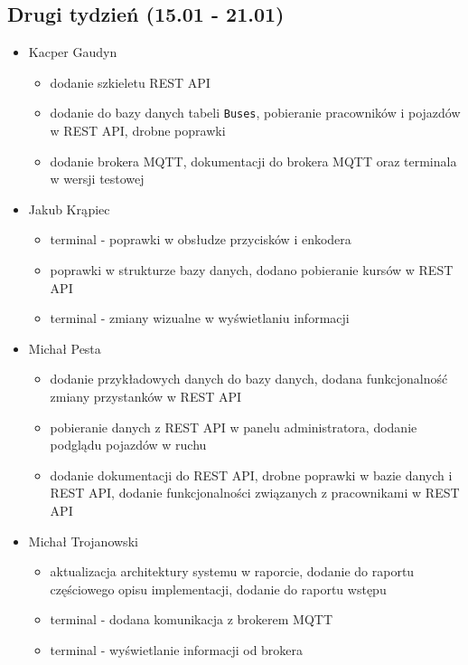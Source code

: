 \subsection{Drugi tydzień (15.01 - 21.01)}
\begin{itemize}
  \item{
    Kacper Gaudyn
    \begin{itemize}
      \item{dodanie szkieletu REST API}
      \item{dodanie do bazy danych tabeli \verb|Buses|, pobieranie pracowników i pojazdów w REST API, drobne poprawki}
      \item{dodanie brokera MQTT, dokumentacji do brokera MQTT oraz terminala w wersji testowej}
    \end{itemize}
  }
  \item{
    Jakub Krąpiec
    \begin{itemize}
      \item{terminal - poprawki w obsłudze przycisków i enkodera}
      \item{poprawki w strukturze bazy danych, dodano pobieranie kursów w REST API}
      \item{terminal - zmiany wizualne w wyświetlaniu informacji}
    \end{itemize}
  }
  \item{
    Michał Pesta
    \begin{itemize}
      \item{dodanie przykładowych danych do bazy danych, dodana funkcjonalność zmiany przystanków w REST API}
      \item{pobieranie danych z REST API w panelu administratora, dodanie podglądu pojazdów w ruchu}
      \item{dodanie dokumentacji do REST API, drobne poprawki w bazie danych i REST API, dodanie funkcjonalności związanych z pracownikami w REST API}
    \end{itemize}
  }
  \item{
    Michał Trojanowski
    \begin{itemize}
      \item{aktualizacja architektury systemu w raporcie, dodanie do raportu częściowego opisu implementacji, dodanie do raportu wstępu}
      \item{terminal - dodana komunikacja z brokerem MQTT}
      \item{terminal - wyświetlanie informacji od brokera}
    \end{itemize}
  }
\end{itemize}
